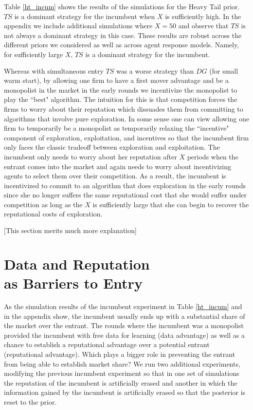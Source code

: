 \documentclass{article}
\theoremstyle{definition}
\begin{document}
Table \ref{ht_incum} shows the results of the simulations for the Heavy Tail prior. $TS$ is a dominant strategy for the incumbent when $X$ is sufficiently high. In the appendix we include additional simulations where $X = 50$ and observe that $TS$ is not always a dominant strategy in this case. These results are robust across the different priors we considered as well as across agent response models. Namely, for sufficiently large $X$, $TS$ is a dominant strategy for the incumbent.

Whereas with simultaneous entry $TS$ was a worse strategy than $DG$ (for small warm start), by allowing one firm to have a first mover advantage and be a monopolist in the market in the early rounds we incentivize the monopolist to play the ``best" algorithm. The intuition for this is that competition forces the firms to worry about their reputation which dissuades them from committing to algorithms that involve pure exploration. In some sense one can view allowing one firm to temporarily be a monopolist as temporarily relaxing the ``incentive" component of exploration, exploitation, and incentives so that the incumbent firm only faces the classic tradeoff between exploration and exploitation. The incumbent only needs to worry about her reputation after $X$ periods when the entrant comes into the market and again needs to worry about incentivizing agents to select them over their competition. As a result, the incumbent is incentivized to commit to an algorithm that does exploration in the early rounds since she no longer suffers the same reputational cost that she would suffer under competition as long as the $X$ is sufficiently large that she can begin to recover the reputational costs of exploration.

[This section merits much more explanation]

\section{Data and Reputation \\ as Barriers to Entry}
\label{S:8}

As the simulation results of the incumbent experiment in Table \ref{ht_incum} and in the appendix show, the incumbent usually ends up with a substantial share of the market over the entrant. The rounds where the incumbent was a monopolist provided the incumbent with free data for learning (data advantage) as well as a chance to establish a reputational advantage over a potential entrant (reputational advantage). Which plays a bigger role in preventing the entrant from being able to establish market share? We run two additional experiments, modifying the previous incumbent experiment so that in one set of simulations the reputation of the incumbent is artificially erased and another in which the information gained by the incumbent is artificially erased so that the posterior is reset to the prior.
\end{document}
